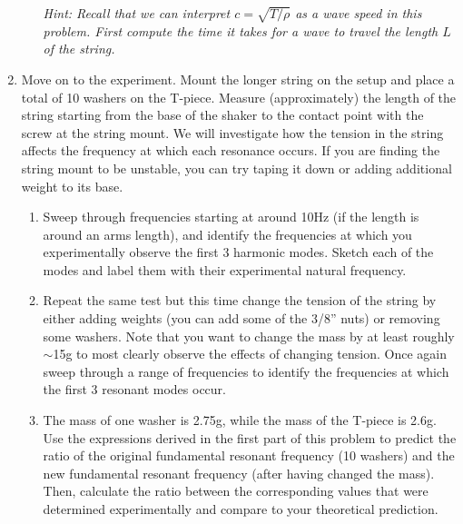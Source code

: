 \documentclass[12pt,letterpaper,english]{article}
\begin{document}
\begin{enumerate}
\begin{enumerate}
{\it \small Hint: Recall that we can interpret $c=\sqrt{T/\rho}$ as a wave speed in this problem.  First compute the time it takes for a wave to travel the length $L$ of the string.}
\end{enumerate}
\item Move on to the experiment.  Mount the longer string on the setup and place a total of 10 washers on the T-piece. Measure (approximately) the length of the string starting from the base of the shaker to the contact point with the screw at the string mount. We will investigate how the tension in the string affects the frequency at which each resonance occurs. If you are finding the string mount to be unstable, you can try taping it down or adding additional weight to its base.
\begin{enumerate}
\item Sweep through frequencies starting at around 10Hz (if the length is around an arms length), and identify the frequencies at which you experimentally observe the first 3 harmonic modes.  Sketch each of the modes and label them with their experimental natural frequency.
\item Repeat the same test but this time change the tension of the string by either adding weights (you can add some of the 3/8'' nuts) or removing some washers. Note that you want to change the mass by at least roughly $\sim$15g to most clearly observe the effects of changing tension.  Once again sweep through a range of frequencies to identify the frequencies at which the first 3 resonant modes occur.
\item The mass of one washer is 2.75g, while the mass of the T-piece is 2.6g. Use the expressions derived in the first part of this problem to predict the ratio of the original fundamental resonant frequency (10 washers) and the new fundamental resonant frequency (after having changed the mass). Then, calculate the ratio between the corresponding values that were determined experimentally and compare to your theoretical prediction. 


\end{enumerate}
\end{enumerate}
\end{document}

